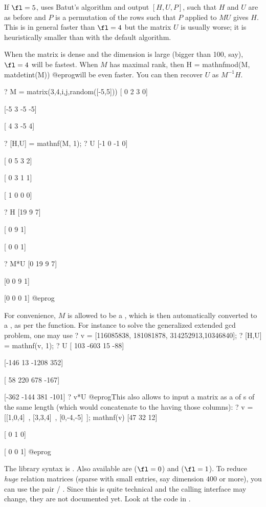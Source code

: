 If $\fl=5$, uses Batut's algorithm and output $[H,U,P]$, such that $H$ and
$U$ are as before and $P$ is a permutation of the rows such that $P$ applied
to $MU$ gives $H$. This is in general faster than $\fl=4$ but the matrix $U$
is usually worse; it is heuristically smaller than with the default algorithm.

When the matrix is dense and the dimension is large (bigger than 100, say),
$\fl = 4$ will be fastest. When $M$ has maximal rank, then
\bprog
  H = mathnfmod(M, matdetint(M))
@eprog\noindent will be even faster. You can then recover $U$ as $M^{-1}H$.

\bprog
? M = matrix(3,4,i,j,random([-5,5]))
[ 0 2  3  0]

[-5 3 -5 -5]

[ 4 3 -5  4]

? [H,U] = mathnf(M, 1);
? U
[-1 0 -1 0]

[ 0 5  3 2]

[ 0 3  1 1]

[ 1 0  0 0]

? H
[19 9 7]

[ 0 9 1]

[ 0 0 1]

? M*U
[0 19 9 7]

[0  0 9 1]

[0  0 0 1]
@eprog

For convenience, $M$ is allowed to be a , which is then
automatically converted to a , as per the  function.
For instance to solve the generalized extended gcd problem, one may use
\bprog
? v = [116085838, 181081878, 314252913,10346840];
? [H,U] = mathnf(v, 1);
? U
[ 103 -603    15  -88]

[-146   13 -1208  352]

[  58  220   678 -167]

[-362 -144   381 -101]
? v*U
@eprog\noindent This also allows to input a matrix as a  of
s of the same length (which  would concatenate to
the  having those columns):
\bprog
? v = [[1,0,4]~, [3,3,4]~, [0,-4,-5]~]; mathnf(v)
[47 32 12]

[ 0  1  0]

[ 0  0  1]
@eprog

The library syntax is .
Also available are  ($\fl=0$) and
 ($\fl=1$). To reduce \emph{huge} relation matrices
(sparse with small entries, say dimension $400$ or more), you can use the
pair  / . Since this is quite technical and the
calling interface may change, they are not documented yet. Look at the code
in .

